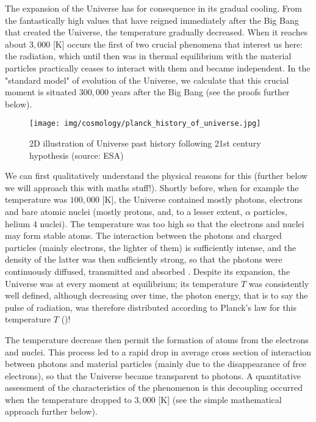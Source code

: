 	The expansion of the Universe has for consequence in its gradual cooling. From the fantastically high values that have reigned immediately after the Big Bang that created the Universe, the temperature gradually decreased. When it reaches about $3,000$ [K] occurs the first of two crucial phenomena that interest us here: the radiation, which until then was in thermal equilibrium with the material particles practically ceases to interact with them and became independent. In the "standard model" of evolution of the Universe, we calculate that this crucial moment is situated $300,000$ years after the Big Bang (see the proofs further below).
	\begin{figure}[H]
		\centering
		\texttt{[image: img/cosmology/planck\_history\_of\_universe.jpg]}
		\caption[2D illustration of Universe past history following 21st century hypothesis]{2D illustration of Universe past history following 21st century hypothesis (source: ESA)}
	\end{figure}
	We can first qualitatively understand the physical reasons for this (further below we will approach this with maths stuff!). Shortly before, when for example the temperature was $100,000$ [K], the Universe contained mostly photons, electrons and bare atomic nuclei (mostly protons, and, to a lesser extent, $\alpha$ particles, helium $4$ nuclei). The temperature was too high so that the electrons and nuclei may form stable atoms. The interaction between the photons and charged particles (mainly electrons, the lighter of them) is sufficiently intense, and the density of the latter was then sufficiently strong, so that the photons were continuously diffused, transmitted and absorbed . Despite its expansion, the Universe was at every moment at equilibrium; its temperature $T$ was consistently well defined, although decreasing over time, the photon energy, that is to say the pulse of radiation, was therefore distributed according to Planck's law for this temperature $T$ ()!
	
	The temperature decrease then permit the formation of atoms from the electrons and nuclei. This process led to a rapid drop in average cross section of interaction between photons and material particles (mainly due to the disappearance of free electrons), so that the Universe became transparent to photons. A quantitative assessment of the characteristics of the phenomenon is this decoupling occurred when the temperature dropped to $3,000$ [K] (see the simple mathematical approach further below).

